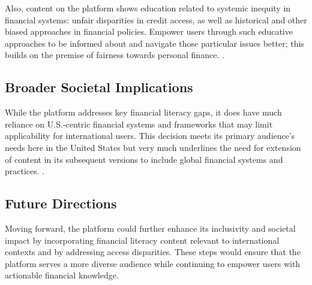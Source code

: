\documentclass[11pt,twocolumn]{article}
\begin{document}
Also, content on the platform shows education related to systemic inequity in financial systems: unfair disparities in credit access, as well as historical and other biased approaches in financial policies. Empower users through such educative approaches to be informed about and navigate those particular issues better; this builds on the premise of fairness towards personal finance. \cite{noble}.

\subsection{Broader Societal Implications}
While the platform addresses key financial literacy gaps, it does have much reliance on U.S.-centric financial systems and frameworks that may limit applicability for international users. This decision meets its primary audience's needs here in the United States but very much underlines the need for extension of content in its subsequent versions to include global financial systems and practices. \cite{worldbank}.


\subsection{Future Directions}
Moving forward, the platform could further enhance its inclusivity and societal impact by incorporating financial literacy content relevant to international contexts and by addressing access disparities. These steps would ensure that the platform serves a more diverse audience while continuing to empower users with actionable financial knowledge.
\end{document}
